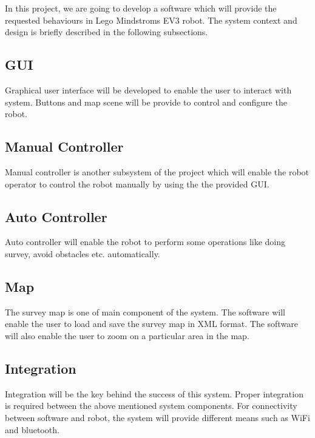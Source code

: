 In this project, we are going to develop a software which will provide the requested behaviours in Lego Mindstroms EV3 robot. The system context and design is briefly described in the following subsections.
\subsection{GUI}
Graphical user interface will be developed to enable the user to interact with system. Buttons and map scene will be provide to control and configure the robot.  
\subsection{Manual Controller}
Manual controller is another subsystem of the project which will enable the robot operator to control the robot manually by using the the provided GUI. 
\subsection{Auto Controller}
Auto controller will enable the robot to perform some operations like doing survey, avoid obstacles etc. automatically. 
\subsection{Map}
The survey map is one of main component of the system. The software will enable the user to load and save the survey map in XML format. The software will also enable the user to zoom on a particular area in the map. 
\subsection{Integration}
Integration will be the key behind the success of this system. Proper integration is required between the above mentioned system components. For connectivity between software and robot, the system will provide different means such as WiFi and bluetooth.  
